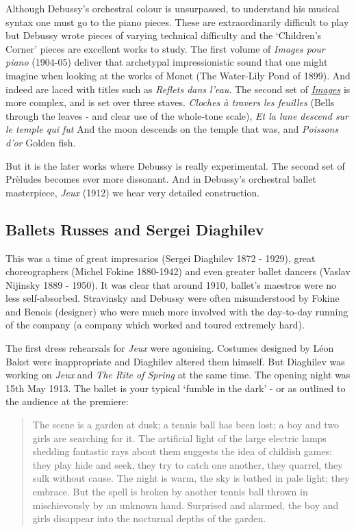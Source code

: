 Although Debussy's orchestral colour is unsurpassed, to understand his musical syntax one must go to the piano pieces. These are extraordinarily difficult to play but Debussy wrote pieces of varying technical difficulty and the `Children's Corner' pieces are excellent works to study. The first volume of \textit{Images pour piano} (1904-05) deliver that archetypal impressionistic sound that one might imagine when looking at the works of Monet (The Water-Lily Pond of 1899). And indeed are laced with titles such as \textit{Reflets dans l'eau}. The second set of \href{http://petrucci.mus.auth.gr/imglnks/usimg/4/4a/IMSLP254485-PMLP02391-Debussy__Claude-Images_2e_Serie_pour_Piano_seul_Durand_6994_scan.pdf}{\textit{Images}} is more complex, and is set over three staves. \textit{Cloches à travers les feuilles} (Bells through the leaves - and clear use of the whole-tone scale), \textit{Et la lune descend sur le temple qui fut} And the moon descends on the temple that was, and \textit{Poissons d'or} Golden fish. 

But it is the later works where Debussy is really experimental. The second set of Pr\`eludes becomes ever more dissonant. And in Debussy's orchestral ballet masterpiece, \textit{Jeux} (1912) we hear very detailed construction. 

\subsection{Ballets Russes and Sergei Diaghilev}
This was a time of great impresarios (Sergei Diaghilev 1872 - 1929), great choreographers (Michel Fokine 1880-1942) and even greater ballet dancers (Vaslav Nijinsky 1889 - 1950). It was clear that around 1910, ballet's maestros were no less self-absorbed. Stravinsky and Debussy were often misunderstood by Fokine and Benois (designer) who were much more involved with the day-to-day running of the company (a company which worked and toured extremely hard). 

The first dress rehearsals for \textit{Jeux} were agonising. Costumes designed by L\'eon Bakst were inappropriate and Diaghilev altered them himself. But Diaghilev was working on \textit{Jeux} and \textit{The Rite of Spring} at the same time. The opening night was 15th May 1913. The ballet is your typical `fumble in the dark' - or as outlined to the audience at the premiere:

\begin{quotation}
The scene is a garden at dusk; a tennis ball has been lost; a boy and two girls are searching for it. The artificial light of the large electric lamps shedding fantastic rays about them suggests the idea of childish games: they play hide and seek, they try to catch one another, they quarrel, they sulk without cause. The night is warm, the sky is bathed in pale light; they embrace. But the spell is broken by another tennis ball thrown in mischievously by an unknown hand. Surprised and alarmed, the boy and girls disappear into the nocturnal depths of the garden.
\end{quotation}

